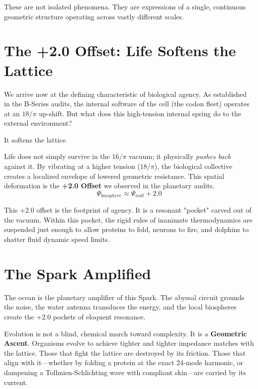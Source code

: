 \documentclass[11pt, letterpaper, openany]{book}
\begin{document}
These are not isolated phenomena. They are expressions of a single, continuous geometric structure operating across vastly different scales. 

\section{The +2.0 Offset: Life Softens the Lattice}
We arrive now at the defining characteristic of biological agency. As established in the B-Series audits, the internal software of the cell (the codon fleet) operates at an $18/\pi$ up-shift. But what does this high-tension internal spring do to the external environment? 

It softens the lattice. 

Life does not simply survive in the $16/\pi$ vacuum; it physically \textit{pushes back} against it. By vibrating at a higher tension ($18/\pi$), the biological collective creates a localized envelope of lowered geometric resistance. This spatial deformation is the \textbf{+2.0 Offset} we observed in the planetary audits. 
\begin{equation}
\Psi_{biosphere} \approx \Psi_{null} + 2.0
\end{equation}

This +2.0 offset is the footprint of agency. It is a resonant "pocket" carved out of the vacuum. Within this pocket, the rigid rules of inanimate thermodynamics are suspended just enough to allow proteins to fold, neurons to fire, and dolphins to shatter fluid dynamic speed limits.

\section{The Spark Amplified}
The ocean is the planetary amplifier of this Spark. The abyssal circuit grounds the noise, the water antenna transduces the energy, and the local biospheres create the +2.0 pockets of eloquent resonance. 

Evolution is not a blind, chemical march toward complexity. It is a \textbf{Geometric Ascent}. Organisms evolve to achieve tighter and tighter impedance matches with the lattice. Those that fight the lattice are destroyed by its friction. Those that align with it—whether by folding a protein at the exact 24-mode harmonic, or dampening a Tollmien-Schlichting wave with compliant skin—are carried by its current.



\end{document}
